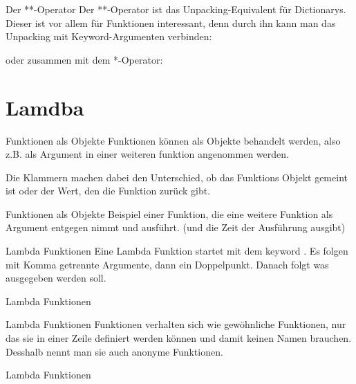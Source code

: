 \begin{frame}{Der **-Operator}
	Der **-Operator ist das Unpacking-Equivalent für Dictionarys. Dieser ist vor allem für Funktionen interessant, denn durch ihn kann man das Unpacking mit Keyword-Argumenten verbinden:
	
	oder zusammen mit dem *-Operator:
	
\end{frame}



\section{Lamdba}

\begin{frame}{Funktionen als Objekte}
	Funktionen können als Objekte behandelt werden, also z.B. als Argument in einer weiteren funktion angenommen werden.
	
	
	Die Klammern machen dabei den Unterschied, ob das Funktions Objekt gemeint ist oder der Wert, den die Funktion zurück gibt.
\end{frame}

\begin{frame}{Funktionen als Objekte}
	Beispiel einer Funktion, die eine weitere Funktion  als Argument entgegen nimmt und ausführt. (und die Zeit der Ausführung ausgibt) 
	
\end{frame}
\begin{frame}{Lambda Funktionen}
	Eine Lambda Funktion startet mit dem keyword . Es folgen mit Komma getrennte Argumente, dann ein Doppelpunkt. Danach folgt was ausgegeben werden soll.
	
\end{frame}{Lambda Funktionen}

\begin{frame}{Lambda Funktionen}
	 Funktionen verhalten sich wie gewöhnliche Funktionen, nur das sie in einer Zeile definiert werden können und damit keinen Namen brauchen. Desshalb nennt man sie auch \alert{anonyme Funktionen}.
	
\end{frame}{Lambda Funktionen}


